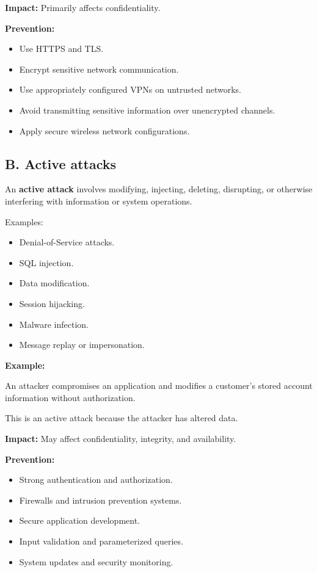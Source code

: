 \textbf{Impact:} Primarily affects confidentiality.

\textbf{Prevention:}

\begin{itemize}
\item Use HTTPS and TLS.
\item Encrypt sensitive network communication.
\item Use appropriately configured VPNs on untrusted networks.
\item Avoid transmitting sensitive information over unencrypted channels.
\item Apply secure wireless network configurations.
\end{itemize}

\subsection{B. Active attacks}

An \textbf{active attack} involves modifying, injecting, deleting, disrupting, or otherwise interfering with information or system operations.

Examples:

\begin{itemize}
\item Denial-of-Service attacks.
\item SQL injection.
\item Data modification.
\item Session hijacking.
\item Malware infection.
\item Message replay or impersonation.
\end{itemize}

\textbf{Example:}

An attacker compromises an application and modifies a customer's stored account information without authorization.

This is an active attack because the attacker has altered data.

\textbf{Impact:} May affect confidentiality, integrity, and availability.

\textbf{Prevention:}

\begin{itemize}
\item Strong authentication and authorization.
\item Firewalls and intrusion prevention systems.
\item Secure application development.
\item Input validation and parameterized queries.
\item System updates and security monitoring.
\end{itemize}

